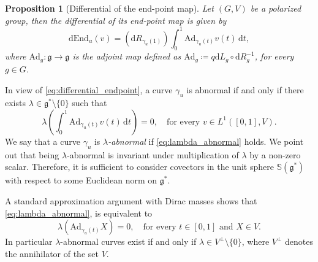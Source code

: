 \documentclass[a4paper,11pt,reqno]{amsart}
\theoremstyle{plain}
\newtheorem{proposition}[theorem]{Proposition}
\theoremstyle{definition}
\newcommand{\g}{\mathfrak{g}}
\newcommand{\de}{\mathrm{d}}
\newcommand{\End}{\mathrm{End}}
\newcommand{\Ad}{\mathrm{Ad}}
\begin{document}
\begin{proposition}[Differential of the end-point map] Let $(G,V)$ be a polarized group, then the differential of its end-point map is given by
    \begin{equation} \label{eq:differential_endpoint}
        \de \End_u (v) = \left(\de R_{\gamma_{u}(1)}\right) \int^1_0 \Ad_{\gamma_u(t)} v(t) \, \de t,
    \end{equation}
    where $\Ad_g \colon \g \to \g$ is the \emph{adjoint map} defined as $\Ad_g \coloneq q \de L_g \circ \de R^{-1}_g$, for every $g \in G$.
\end{proposition}

In view of \eqref{eq:differential_endpoint}, a curve $\gamma_u$ is abnormal if and only if there exists $\lambda \in \g^* \setminus \{0\}$ such that
\begin{equation} \label{eq:lambda_abnormal}
    \lambda \left( \int^1_0 \Ad_{\gamma_u(t)} v(t) \, \de t \right) = 0, \quad \text{for every $v \in L^1([0,1],V)$.}
\end{equation}
We say that a curve $\gamma_u$ is \emph{$\lambda$-abnormal} if \eqref{eq:lambda_abnormal} holds. We point out that being $\lambda$-abnormal is invariant under multiplication of $\lambda$ by a non-zero scalar. Therefore, it is sufficient to consider covectors in the unit sphere $\mathbb{S}(\g^*)$ with respect to some Euclidean norm on $\g^*$.

A standard approximation argument with Dirac masses shows that \eqref{eq:lambda_abnormal}, is equivalent to 
\begin{equation}
\label{eq:abn-equivalence}
    \lambda \left( \Ad_{\gamma_u(t)} X \right) = 0, \quad \text{for every $t \in [0,1]$ and $X \in V$}.
\end{equation}
In particular $\lambda$-abnormal curves exist if and only if $\lambda \in V^\perp\setminus \{0\}$, where $V^\perp$ denotes the annihilator of the set $V$. 
\end{document}
